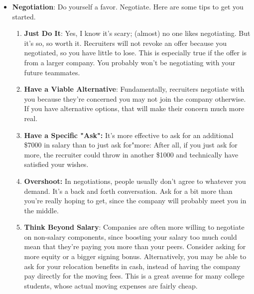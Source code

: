 \documentclass{report}
\begin{document}
\begin{itemize}
\begin{itemize}
                \item \textbf{Company Culture}: Culture is tied to everything from how decisions get made, to the social atmosphere, to how the company is organized. Ask your future teammates how they would describe the culture.
                \item \textbf{Hours}: Ask future teammates about how long they typically work, and figure out if that meshes with your lifestyle. Remember, though, that hours before major deadlines are typically much longer
            \end{itemize}
        \item \textbf{Negotiation}: Do yourself a favor. Negotiate. Here are some tips to get you started.
            \begin{enumerate}
                \item \textbf{Just Do It}: Yes, I know it's scary; (almost) no one likes negotiating. But it's so, so worth it. Recruiters will not revoke an offer because you negotiated, so you have little to lose. This is especially true if the offer is from a larger company. You probably won't be negotiating with your future teammates.
                \item \textbf{Have a Viable Alternative}: Fundamentally, recruiters negotiate with you because they're concerned you may not join the company otherwise. If you have alternative options, that will make their concern much more real.
                \item \textbf{Have a Specific "Ask":} It's more effective to ask for an additional \$7000 in salary than to just ask for"more: After all, if you just ask for more, the recruiter could throw in another \$1000 and technically have satisfied your wishes.
                \item \textbf{Overshoot:} In negotiations, people usually don't agree to whatever you demand. It's a back and forth conversation. Ask for a bit more than you're really hoping to get, since the company will probably meet you in the middle.
                \item \textbf{Think Beyond Salary}: Companies are often more willing to negotiate on non-salary components, since boosting your salary too much could mean that they're paying you more than your peers. Consider asking for more equity or a bigger signing bonus. Alternatively, you may be able to ask for your relocation benefits in cash, instead of having the company pay directly for the moving fees. This is a great avenue for many college students, whose actual moving expenses are fairly cheap.

\end{enumerate}
\end{itemize}
\end{document}
